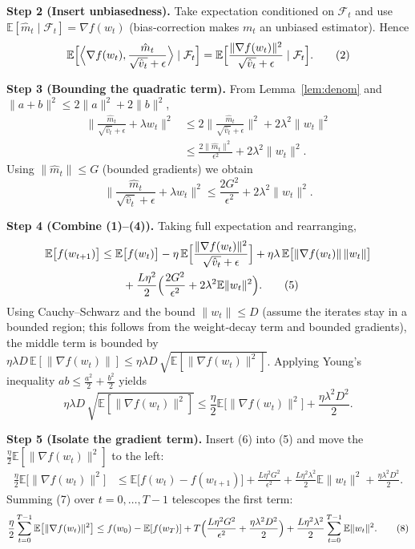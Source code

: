 \documentclass{article}
\newcommand{\E}{\mathbb{E}}
\begin{document}
\noindent\textbf{Step 2 (Insert unbiasedness).}  
Take expectation conditioned on $\mathcal{F}_{t}$ and use $\E[\hat m_t\mid\mathcal{F}_{t}]=\nabla f(w_t)$ (bias‑correction makes $m_t$ an unbiased estimator). Hence
\[
\E\Bigl[\Big\langle \nabla f(w_t),\frac{\hat m_t}{\sqrt{\hat v_t}+\epsilon}\Big\rangle\mid\mathcal{F}_{t}\Bigr]
= \E\Bigl[\frac{\|\nabla f(w_t)\|^{2}}{\sqrt{\hat v_t}+\epsilon}\mid\mathcal{F}_{t}\Bigr]. \tag{2}
\]

\noindent\textbf{Step 3 (Bounding the quadratic term).}  
From Lemma~\ref{lem:denom} and $\|a+b\|^{2}\le 2\|a\|^{2}+2\|b\|^{2}$,
\begin{align}
\Big\|\frac{\hat m_t}{\sqrt{\hat v_t}+\epsilon}+\lambda w_t\Big\|^{2}
&\le 2\Big\|\frac{\hat m_t}{\sqrt{\hat v_t}+\epsilon}\Big\|^{2}+2\lambda^{2}\|w_t\|^{2} \nonumber\\
&\le \frac{2\|\hat m_t\|^{2}}{\epsilon^{2}}+2\lambda^{2}\|w_t\|^{2}. \tag{3}
\end{align}
Using $\|\hat m_t\|\le G$ (bounded gradients) we obtain
\[
\Big\|\frac{\hat m_t}{\sqrt{\hat v_t}+\epsilon}+\lambda w_t\Big\|^{2}
\le \frac{2G^{2}}{\epsilon^{2}}+2\lambda^{2}\|w_t\|^{2}. \tag{4}
\]

\noindent\textbf{Step 4 (Combine (1)–(4)).}  
Taking full expectation and rearranging,
\begin{align}
\E\bigl[f(w_{t+1})\bigr] 
&\le \E\bigl[f(w_t)\bigr] 
   -\eta\,\E\Bigl[\frac{\|\nabla f(w_t)\|^{2}}{\sqrt{\hat v_t}+\epsilon}\Bigr] 
   +\eta\lambda\,\E\bigl[\|\nabla f(w_t)\|\,\|w_t\|\bigr] \nonumber\\
&\qquad +\frac{L\eta^{2}}{2}\Bigl(\frac{2G^{2}}{\epsilon^{2}}+2\lambda^{2}\E\|w_t\|^{2}\Bigr). \tag{5}
\end{align}
Using Cauchy–Schwarz and the bound $\|w_t\|\le D$ (assume the iterates stay in a bounded region; this follows from the weight‑decay term and bounded gradients), the middle term is bounded by $\eta\lambda D\,\E[\|\nabla f(w_t)\|]\le \eta\lambda D\,\sqrt{\E[\|\nabla f(w_t)\|^{2}]}$. Applying Young’s inequality $ab\le \frac{a^{2}}{2}+ \frac{b^{2}}{2}$ yields
\[
\eta\lambda D\,\sqrt{\E[\|\nabla f(w_t)\|^{2}]}
\le \frac{\eta}{2}\E\bigl[\|\nabla f(w_t)\|^{2}\bigr]
   +\frac{\eta\lambda^{2}D^{2}}{2}. \tag{6}
\]

\noindent\textbf{Step 5 (Isolate the gradient term).}  
Insert (6) into (5) and move the $\frac{\eta}{2}\E[\|\nabla f(w_t)\|^{2}]$ to the left:
\begin{align}
\frac{\eta}{2}\E\bigl[\|\nabla f(w_t)\|^{2}\bigr]
&\le \E\bigl[f(w_t)-f(w_{t+1})\bigr]
   +\frac{L\eta^{2}G^{2}}{\epsilon^{2}}
   +\frac{L\eta^{2}\lambda^{2}}{2}\E\|w_t\|^{2}
   +\frac{\eta\lambda^{2}D^{2}}{2}. \tag{7}
\end{align}
Summing (7) over $t=0,\dots,T-1$ telescopes the first term:
\[
\frac{\eta}{2}\sum_{t=0}^{T-1}\E\bigl[\|\nabla f(w_t)\|^{2}\bigr]
\le f(w_0)-\E[f(w_T)] + T\Bigl(\frac{L\eta^{2}G^{2}}{\epsilon^{2}}+\frac{\eta\lambda^{2}D^{2}}{2}\Bigr)
   +\frac{L\eta^{2}\lambda^{2}}{2}\sum_{t=0}^{T-1}\E\|w_t\|^{2}. \tag{8}
\]
\end{document}

